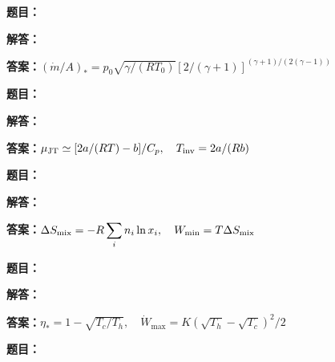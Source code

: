 \documentclass[lang=cn,color=blue,11pt]{elegantbook}
\begin{document}
\noindent\textbf{题目：}
\par\noindent\textbf{解答：}
\par\noindent\textbf{答案：}\(\displaystyle (\dot m/A)_*=p_0\sqrt{\gamma/(RT_0)}[2/(\gamma+1)]^{(\gamma+1)/(2(\gamma-1))}\)\par
\par\smallskip\noindent\hrulefill\par\medskip
{}\par
\noindent\textbf{题目：}
\par\noindent\textbf{解答：}
\par\noindent\textbf{答案：}\(\displaystyle \mu_{\rm JT}\simeq[2a/(RT)-b]/C_p,\quad T_{\rm inv}=2a/(Rb)\)\par
\par\smallskip\noindent\hrulefill\par\medskip
{}\par
\noindent\textbf{题目：}
\par\noindent\textbf{解答：}
\par\noindent\textbf{答案：}\(\displaystyle \Delta S_{\rm mix}=-R\sum_i n_i\ln x_i,\quad W_{\min}=T\Delta S_{\rm mix}\)\par
\par\smallskip\noindent\hrulefill\par\medskip
{}\par
\noindent\textbf{题目：}
\par\noindent\textbf{解答：}
\par\noindent\textbf{答案：}\(\displaystyle \eta_*=1-\sqrt{T_c/T_h},\quad\dot W_{\max}=K(\sqrt{T_h}-\sqrt{T_c})^2/2\)\par
\par\smallskip\noindent\hrulefill\par\medskip
{}\par
\noindent\textbf{题目：}
\end{document}
